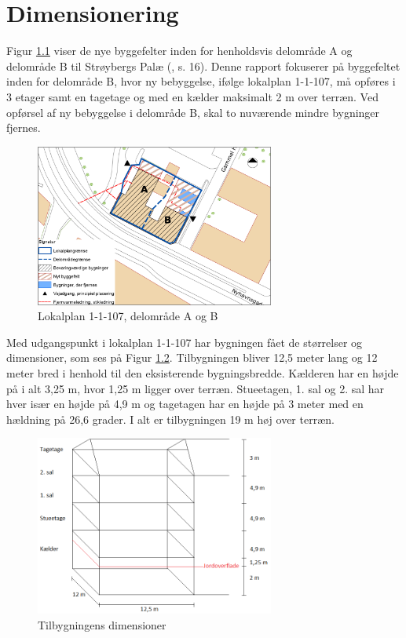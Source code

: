 \chapter{Dimensionering}

Figur \ref{fig:hej} viser de nye byggefelter inden for henholdsvis delområde A og delområde B til Strøybergs Palæ (\citep{lokalplan}, s. 16). Denne rapport fokuserer på byggefeltet inden for delområde B, hvor ny bebyggelse, ifølge lokalplan 1-1-107, må opføres i 3 etager samt en tagetage og med en kælder maksimalt 2 m over terræn. Ved opførsel af ny bebyggelse i delområde B, skal to nuværende mindre bygninger fjernes. 

\begin{figure}[htbp]
	\centering
	\includegraphics[width=0.7\textwidth]{billeder/signatur.png}
	\caption{Lokalplan 1-1-107, delområde A og B \citep{lokalplan[ bilag 2, s. 35]}}
	\label{fig:hej}
\end{figure}

Med udgangspunkt i lokalplan 1-1-107 har bygningen fået de størrelser og dimensioner, som ses på Figur \ref{fig:farvel}.
\newline \indent{     }  Tilbygningen bliver 12,5 meter lang og 12 meter bred i henhold til den eksisterende bygningsbredde. Kælderen har en højde på i alt 3,25 m, hvor 1,25 m ligger over terræn. Stueetagen, 1. sal og 2. sal har hver især en højde på 4,9 m og tagetagen har en højde på 3 meter med en hældning på 26,6 grader. I alt er tilbygningen 19 m høj over terræn.

\begin{figure}[htbp]
	\centering
	\includegraphics[width=0.7\textwidth]{billeder/tilbygning2.png}
	\caption{Tilbygningens dimensioner}
	\label{fig:farvel}
\end{figure}

